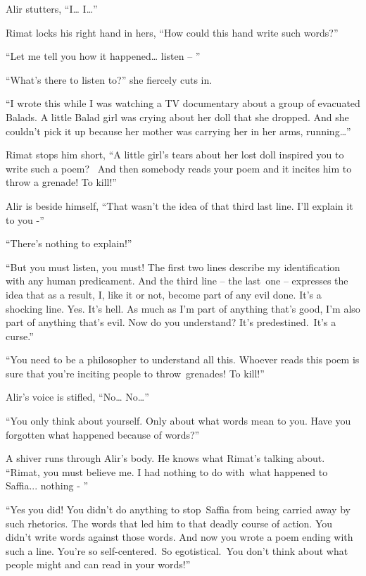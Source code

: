 \documentclass[twoside,11pt]{book}
\begin{document}
Alir stutters, ``I{\dots} I{\dots}'' 

Rimat locks his right hand in hers, ``How could this hand write such words?'' 

``Let me tell you how it happened{\dots} listen -- '' 

``What's there to listen to?'' she fiercely cuts in.

``I wrote this while I was watching a TV documentary about a group of evacuated Balads. A little Balad girl
was crying about her doll that she dropped. And she couldn't pick it up because her mother was carrying her in her
arms, running{\dots}'' 

Rimat stops him short, ``A little girl's tears about her lost doll inspired you to write such a poem?~ And
then somebody reads your poem and it incites him to throw a grenade! To kill!'' 

Alir is beside himself, ``That wasn't the idea of that third last line. I'll explain it to you
-'' 

``There's nothing to explain!'' 

``But you must listen, you must! The first two lines describe my identification with any human predicament.
And the third line -- the last\ one -- expresses the idea that as a result, I, like it or not, become part of any evil
done. It's a shocking line. Yes. It's hell. As much as I'm part of anything that's good, I'm also part of anything
that's evil. Now do you understand? It's predestined.\ It's a curse.'' 

``You need to be a philosopher to understand all this. Whoever reads this poem is sure that you're inciting
people to throw~grenades! To kill!'' 

Alir's voice is stifled, ``No{\dots} No{\dots}'' 

``You only think about yourself. Only about what words mean to you. Have you forgotten what happened
because of words?''

A shiver runs through Alir's body. He knows what Rimat{}'s talking about. ``Rimat, you must believe me. I
had nothing to do with~what happened to Saffia... nothing - '' 

``Yes you did! You didn't do anything to stop~Saffia from being carried away by such rhetorics. The words
that led him to that deadly course of action. You didn't write words against those words. And now you wrote a poem
ending with such a line. You're so self-centered.\ So
egotistical.{\ }You don't think about what people might and can read
in your words!'' \ 
\end{document}
